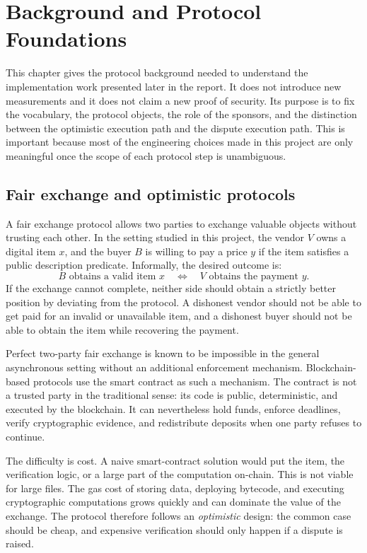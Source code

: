 \chapter{Background and Protocol Foundations}
\label{chap:background}

This chapter gives the protocol background needed to understand the implementation work
presented later in the report. It does not introduce new measurements and it does not claim a
new proof of security. Its purpose is to fix the vocabulary, the protocol objects, the role
of the sponsors, and the distinction between the optimistic execution path and the dispute
execution path. This is important because most of the engineering choices made in this
project are only meaningful once the scope of each protocol step is unambiguous.

\section{Fair exchange and optimistic protocols}

A fair exchange protocol allows two parties to exchange valuable objects without trusting
each other. In the setting studied in this project, the vendor \(V\) owns a digital item
\(x\), and the buyer \(B\) is willing to pay a price \(y\) if the item satisfies a public
description predicate. Informally, the desired outcome is:
\[
  B \text{ obtains a valid item } x
  \quad\Longleftrightarrow\quad
  V \text{ obtains the payment } y.
\]
If the exchange cannot complete, neither side should obtain a strictly better position by
deviating from the protocol. A dishonest vendor should not be able to get paid for an invalid
or unavailable item, and a dishonest buyer should not be able to obtain the item while
recovering the payment.

Perfect two-party fair exchange is known to be impossible in the general asynchronous setting
without an additional enforcement mechanism. Blockchain-based protocols use the smart
contract as such a mechanism. The contract is not a trusted party in the traditional sense:
its code is public, deterministic, and executed by the blockchain. It can nevertheless hold
funds, enforce deadlines, verify cryptographic evidence, and redistribute deposits when one
party refuses to continue.

The difficulty is cost. A naive smart-contract solution would put the item, the verification
logic, or a large part of the computation on-chain. This is not viable for large files. The
gas cost of storing data, deploying bytecode, and executing cryptographic computations grows
quickly and can dominate the value of the exchange. The protocol therefore follows an
\emph{optimistic} design: the common case should be cheap, and expensive verification should
only happen if a dispute is raised.

